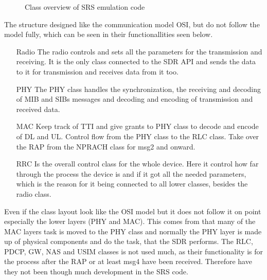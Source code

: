 

\begin{figure}[H]
\centering
\resizebox{0.5\textwidth}{!}{
}
\caption{Class overview of SRS emulation code}
\label{fig:MassClass}
\end{figure}

The structure designed like the communication model OSI, but do not follow the model fully, which can be seen in their functionallities seen below.

\begin{itemize}
\item [Radio] The radio controls and sets all the parameters for the transmission and receiving. It is the only class connected to the SDR API and sends the data to it for transmission and receives data from it too. 
\item [PHY] The PHY class handles the synchronization, the receiving and decoding of MIB and SIBs messages and decoding and encoding of transmission and received data.
\item [MAC] Keep track of TTI and give grants to PHY class to decode and encode of DL and UL. Control flow from the PHY class to the RLC class. Take over the RAP from the NPRACH class for msg2 and onward.
\item [RRC] Is the overall control class for the whole device. Here it control how far through the process the device is and if it got all the needed parameters, which is the reason for it being connected to all lower classes, besides the radio class.
\end{itemize}

Even if the class layout look like the OSI model but it does not follow it on point especially the lower layers (PHY and MAC). This comes from that many of the MAC layers task is moved to the PHY class and normally the PHY layer is made up of physical components and do the task, that the SDR performs. The RLC, PDCP, GW, NAS and USIM classes is not used much, as their functionality is for the process after the RAP or at least msg4 have been received. Therefore have they not been though much development in the SRS code.

